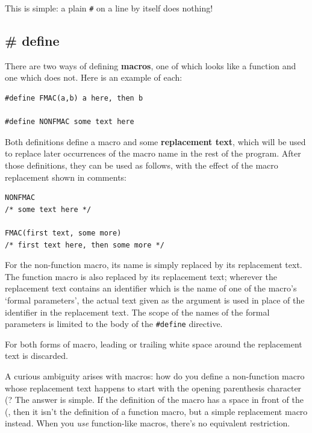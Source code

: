    This is simple: a plain \texttt{\#} on a line by itself does
    nothing!


  

  \subsection{\# define}
   

   There are two ways of defining \textbf{macros}, one of which looks
    like a function and one which does not. Here is an example of each:


   \begin{Verbatim}
#define FMAC(a,b) a here, then b

#define NONFMAC some text here
\end{Verbatim}

   Both definitions define a macro and some \textbf{replacement text},
    which will be used to replace later occurrences of the macro name in the
    rest of the program. After those definitions, they can be used as
    follows, with the effect of the macro replacement shown in comments:


   \begin{Verbatim}
NONFMAC
/* some text here */

FMAC(first text, some more)
/* first text here, then some more */
\end{Verbatim}

   For the non-function macro, its name is simply replaced by its
    replacement text. The function macro is also replaced by its replacement
    text; wherever the replacement text contains an identifier which is the
    name of one of the macro's `formal parameters', the actual text
    given as the argument is used in place of the identifier in the
    replacement text. The scope of the names of the formal parameters is
    limited to the body of the \texttt{\#define} directive.


   For both forms of macro, leading or trailing white space around the
    replacement text is discarded.


   A curious ambiguity arises with macros: how do you define
    a non-function macro whose replacement text happens to start with the
    opening parenthesis character (? The answer is simple. If the definition
    of the macro has a space in front of the (, then it isn't the definition
    of a function macro, but a simple replacement macro instead. When you
    \textit{use} function-like macros, there's no equivalent
    restriction.


